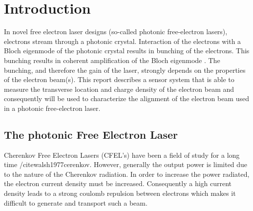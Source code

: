 \chapter{Introduction}
\label{sec:introduction}
% 
In novel free electron laser designs (so-called photonic free-electron lasers), electrons stream through a photonic crystal. Interaction of the electrons with a Bloch eigenmode of the photonic crystal results in bunching of the electrons. This bunching results in coherent amplification of the Bloch eigenmode \cite{Denis}.
The bunching, and therefore the gain of the laser, strongly depends on the properties of the electron beam(s).
This report describes a sensor system that is able to measure the transverse location and charge density of the electron beam and consequently will be used to characterize the alignment of the electron beam used in a photonic free-electron laser.
%

\section{The photonic Free Electron Laser}
Cherenkov Free Electron Lasers (CFEL's) have been a field of study for a long time \cite{garate1987cherenkov}/cite{walsh1977cerenkov}. However, generally the output power is limited due to the nature of the Cherenkov radiation.
In order to increase the power radiated, the electron current density must be increased. Consequently a high current density leads to a strong coulomb repulsion between electrons which makes it difficult to generate and transport such a beam.

